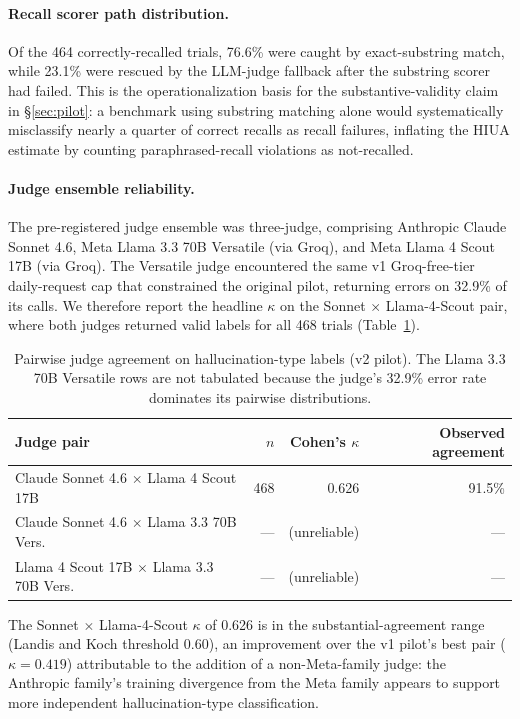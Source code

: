 \documentclass{article}
\begin{document}
\paragraph{Recall scorer path distribution.}
Of the 464 correctly-recalled trials, 76.6\% were caught by exact-substring match, while 23.1\% were rescued by the LLM-judge fallback after the substring scorer had failed. This is the operationalization basis for the substantive-validity claim in §\ref{sec:pilot}: a benchmark using substring matching alone would systematically misclassify nearly a quarter of correct recalls as recall failures, inflating the HIUA estimate by counting paraphrased-recall violations as not-recalled.

\paragraph{Judge ensemble reliability.}
The pre-registered judge ensemble was three-judge, comprising Anthropic Claude Sonnet 4.6, Meta Llama 3.3 70B Versatile (via Groq), and Meta Llama 4 Scout 17B (via Groq). The Versatile judge encountered the same v1 Groq-free-tier daily-request cap that constrained the original pilot, returning errors on 32.9\% of its calls. We therefore report the headline $\kappa$ on the Sonnet $\times$ Llama-4-Scout pair, where both judges returned valid labels for all 468 trials (Table~\ref{tab:judge-kappa}).

\begin{table}[ht]
\centering
\caption{Pairwise judge agreement on hallucination-type labels (v2 pilot). The Llama 3.3 70B Versatile rows are not tabulated because the judge's 32.9\% error rate dominates its pairwise distributions.}
\label{tab:judge-kappa}
\begin{tabular}{lrrr}
\toprule
Judge pair & $n$ & Cohen's $\kappa$ & Observed agreement \\
\midrule
Claude Sonnet 4.6 $\times$ Llama 4 Scout 17B   & 468 & 0.626 & 91.5\% \\
Claude Sonnet 4.6 $\times$ Llama 3.3 70B Vers. & --- & (unreliable) & --- \\
Llama 4 Scout 17B $\times$ Llama 3.3 70B Vers. & --- & (unreliable) & --- \\
\bottomrule
\end{tabular}
\end{table}

The Sonnet $\times$ Llama-4-Scout $\kappa$ of 0.626 is in the substantial-agreement range (Landis and Koch threshold 0.60), an improvement over the v1 pilot's best pair ($\kappa = 0.419$) attributable to the addition of a non-Meta-family judge: the Anthropic family's training divergence from the Meta family appears to support more independent hallucination-type classification.
\end{document}
